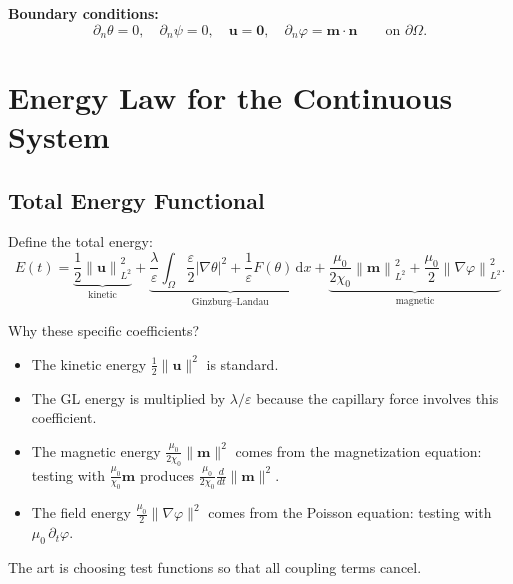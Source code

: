 \documentclass[11pt,a4paper]{article}
\theoremstyle{definition}
\theoremstyle{remark}
\newcommand{\dd}{\,\mathrm{d}}
\newcommand{\dt}{\partial_t}
\newcommand{\dn}{\partial_n}
\newcommand{\grad}{\nabla}
\newcommand{\eps}{\varepsilon}
\newcommand{\norm}[1]{\left\| #1 \right\|}
\newcommand{\bfu}{\bm{u}}
\newcommand{\bfm}{\bm{m}}
\newcommand{\bfn}{\bm{n}}
\begin{document}
\bigskip\noindent
\textbf{Boundary conditions:}
\begin{equation}
  \label{eq:BCs}
  \dn\theta = 0, \quad \dn\psi = 0, \quad
  \bfu = \bm{0}, \quad
  \dn\varphi = \bfm \cdot \bfn
  \qquad \text{on } \partial\Omega.
\end{equation}


\section{Energy Law for the Continuous System}
\label{sec:energy}

\subsection{Total Energy Functional}

Define the total energy:
\begin{equation}
  \label{eq:total-energy}
  E(t) = \underbrace{\frac{1}{2}\norm{\bfu}^2_{L^2}}_{\text{kinetic}}
       + \underbrace{\frac{\lambda}{\eps}\int_\Omega
         \frac{\eps}{2}|\grad\theta|^2
         + \frac{1}{\eps}F(\theta) \dd x}_{\text{Ginzburg--Landau}}
       + \underbrace{\frac{\mu_0}{2\chi_0}\norm{\bfm}^2_{L^2}
         + \frac{\mu_0}{2}\norm{\grad\varphi}^2_{L^2}}_{\text{magnetic}}.
\end{equation}

\begin{derivnote}
Why these specific coefficients?
\begin{itemize}[nosep]
  \item The kinetic energy $\frac{1}{2}\|\bfu\|^2$ is standard.
  \item The GL energy is multiplied by $\lambda/\eps$ because the
        capillary force involves this coefficient.
  \item The magnetic energy $\frac{\mu_0}{2\chi_0}\|\bfm\|^2$ comes
        from the magnetization equation: testing with
        $\frac{\mu_0}{\chi_0}\bfm$ produces
        $\frac{\mu_0}{2\chi_0}\frac{d}{dt}\|\bfm\|^2$.
  \item The field energy $\frac{\mu_0}{2}\|\grad\varphi\|^2$ comes
        from the Poisson equation: testing with $\mu_0\,\dt\varphi$.
\end{itemize}
The art is choosing test functions so that all coupling terms cancel.
\end{derivnote}
\end{document}
